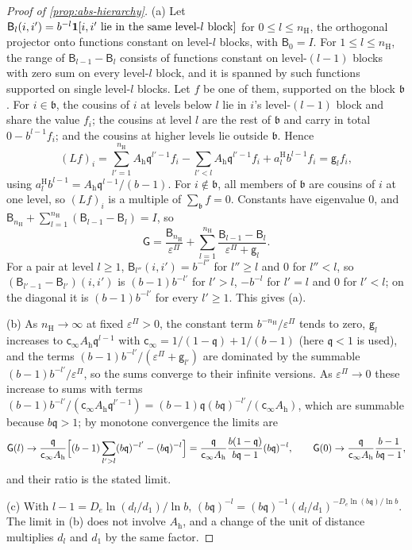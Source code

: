 \begin{proof}[Proof of \cref{prop:abs-hierarchy}]
(a) Let $\mathsf B_{l}(i,i')=b^{-l}\mathbf{1}[i,i'\text{ lie in the same level-}l\text{ block}]$ for $0\le l\le n_{\mathrm H}$, the orthogonal projector onto functions constant on level-$l$ blocks, with $\mathsf B_0=I$. For $1\le l\le n_{\mathrm H}$, the range of $\mathsf B_{l-1}-\mathsf B_l$ consists of functions constant on level-$(l-1)$ blocks with zero sum on every level-$l$ block, and it is spanned by such functions supported on single level-$l$ blocks. Let $f$ be one of them, supported on the block $\mathfrak b$. For $i\in\mathfrak b$, the cousins of $i$ at levels below $l$ lie in $i$'s level-$(l-1)$ block and share the value $f_i$; the cousins at level $l$ are the rest of $\mathfrak b$ and carry in total $0-b^{l-1}f_i$; and the cousins at higher levels lie outside $\mathfrak b$. Hence
\[
(Lf)_i=\sum_{l'=1}^{n_{\mathrm H}}A_{\mathrm h}\mathfrak q^{l'-1}f_i-\sum_{l'<l}A_{\mathrm h}\mathfrak q^{l'-1}f_i+a^{\mathrm H}_lb^{l-1}f_i=\mathsf g_lf_i,
\]
using $a^{\mathrm H}_lb^{l-1}=A_{\mathrm h}\mathfrak q^{l-1}/(b-1)$. For $i\notin\mathfrak b$, all members of $\mathfrak b$ are cousins of $i$ at one level, so $(Lf)_i$ is a multiple of $\sum_{\mathfrak b}f=0$. Constants have eigenvalue 0, and $\mathsf B_{n_{\mathrm H}}+\sum_{l=1}^{n_{\mathrm H}}(\mathsf B_{l-1}-\mathsf B_l)=I$, so
\[
\mathsf G=\frac{\mathsf B_{n_{\mathrm H}}}{\varepsilon^\Pi}+\sum_{l=1}^{n_{\mathrm H}}\frac{\mathsf B_{l-1}-\mathsf B_l}{\varepsilon^\Pi+\mathsf g_l}.
\]
For a pair at level $l\ge1$, $\mathsf B_{l''}(i,i')=b^{-l''}$ for $l''\ge l$ and $0$ for $l''<l$, so $(\mathsf B_{l'-1}-\mathsf B_{l'})(i,i')$ is $(b-1)b^{-l'}$ for $l'>l$, $-b^{-l}$ for $l'=l$ and $0$ for $l'<l$; on the diagonal it is $(b-1)b^{-l'}$ for every $l'\ge1$. This gives (a).

(b) As $n_{\mathrm H}\to\infty$ at fixed $\varepsilon^\Pi>0$, the constant term $b^{-n_{\mathrm H}}/\varepsilon^\Pi$ tends to zero, $\mathsf g_l$ increases to $\mathsf c_\infty A_{\mathrm h}\mathfrak q^{l-1}$ with $\mathsf c_\infty=1/(1-\mathfrak q)+1/(b-1)$ (here $\mathfrak q<1$ is used), and the terms $(b-1)b^{-l'}/(\varepsilon^\Pi+\mathsf g_{l'})$ are dominated by the summable $(b-1)b^{-l'}/\varepsilon^\Pi$, so the sums converge to their infinite versions. As $\varepsilon^\Pi\to0$ these increase to sums with terms $(b-1)b^{-l'}/(\mathsf c_\infty A_{\mathrm h}\mathfrak q^{l'-1})=(b-1)\mathfrak q(b\mathfrak q)^{-l'}/(\mathsf c_\infty A_{\mathrm h})$, which are summable because $b\mathfrak q>1$; by monotone convergence the limits are
\[
\mathsf G(l)\to\frac{\mathfrak q}{\mathsf c_\infty A_{\mathrm h}}\Bigl[(b-1)\sum_{l'>l}(b\mathfrak q)^{-l'}-(b\mathfrak q)^{-l}\Bigr]=\frac{\mathfrak q}{\mathsf c_\infty A_{\mathrm h}}\frac{b(1-\mathfrak q)}{b\mathfrak q-1}(b\mathfrak q)^{-l},\qquad\mathsf G(0)\to\frac{\mathfrak q}{\mathsf c_\infty A_{\mathrm h}}\frac{b-1}{b\mathfrak q-1},
\]
and their ratio is the stated limit.

(c) With $l-1=D_e\ln(d_l/d_1)/\ln b$, $(b\mathfrak q)^{-l}=(b\mathfrak q)^{-1}(d_l/d_1)^{-D_e\ln(b\mathfrak q)/\ln b}$. The limit in (b) does not involve $A_{\mathrm h}$, and a change of the unit of distance multiplies $d_l$ and $d_1$ by the same factor.
\end{proof}

